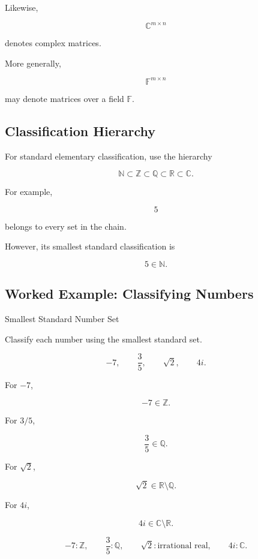 Likewise,

\[
\boxed{
\mathbb{C}^{m\times n}
}
\]

denotes complex matrices.

More generally,

\[
\boxed{
\mathbb{F}^{m\times n}
}
\]

may denote matrices over a field \(\mathbb{F}\).

\subsection{Classification Hierarchy}
\label{subsec:number-classification-hierarchy}

For standard elementary classification, use the hierarchy

\[
\boxed{
\mathbb{N}
\subset
\mathbb{Z}
\subset
\mathbb{Q}
\subset
\mathbb{R}
\subset
\mathbb{C}.
}
\]

For example,

\[
5
\]

belongs to every set in the chain.

However, its smallest standard classification is

\[
\boxed{
5\in\mathbb{N}.
}
\]

\subsection{Worked Example: Classifying Numbers}
\label{subsec:worked-classifying-numbers}

\begin{workedexamplebox}{Smallest Standard Number Set}

Classify each number using the smallest standard set.

\[
-7,
\qquad
\frac{3}{5},
\qquad
\sqrt2,
\qquad
4i.
\]

For \(-7\),

\[
-7\in\mathbb{Z}.
\]

For \(3/5\),

\[
\frac35\in\mathbb{Q}.
\]

For \(\sqrt2\),

\[
\sqrt2\in\mathbb{R}\setminus\mathbb{Q}.
\]

For \(4i\),

\[
4i\in\mathbb{C}\setminus\mathbb{R}.
\]

\begin{answerbox}
\[
\boxed{
-7:\mathbb{Z},
\qquad
\frac35:\mathbb{Q},
\qquad
\sqrt2:\text{irrational real},
\qquad
4i:\mathbb{C}.
}
\]
\end{answerbox}

\end{workedexamplebox}

